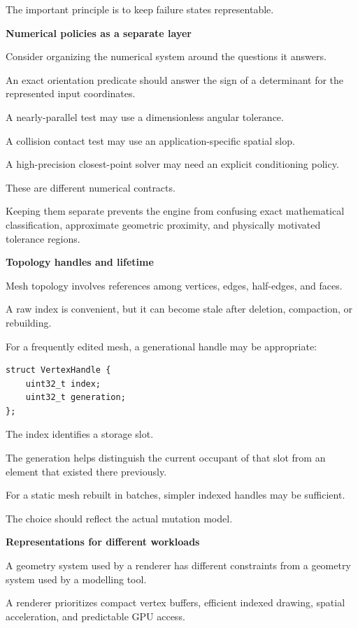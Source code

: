 The important principle is to keep failure states representable.

\textbf{Numerical policies as a separate layer}

Consider organizing the numerical system around the questions it answers.

An exact orientation predicate should answer the sign of a determinant for the represented input coordinates.

A nearly-parallel test may use a dimensionless angular tolerance.

A collision contact test may use an application-specific spatial slop.

A high-precision closest-point solver may need an explicit conditioning policy.

These are different numerical contracts.

Keeping them separate prevents the engine from confusing exact mathematical classification, approximate geometric proximity, and physically motivated tolerance regions.

\textbf{Topology handles and lifetime}

Mesh topology involves references among vertices, edges, half-edges, and faces.

A raw index is convenient, but it can become stale after deletion, compaction, or rebuilding.

For a frequently edited mesh, a generational handle may be appropriate:

\begin{verbatim}
struct VertexHandle {
    uint32_t index;
    uint32_t generation;
};
\end{verbatim}

The index identifies a storage slot.

The generation helps distinguish the current occupant of that slot from an element that existed there previously.

For a static mesh rebuilt in batches, simpler indexed handles may be sufficient.

The choice should reflect the actual mutation model.

\textbf{Representations for different workloads}

A geometry system used by a renderer has different constraints from a geometry system used by a modelling tool.

A renderer prioritizes compact vertex buffers, efficient indexed drawing, spatial acceleration, and predictable GPU access.

